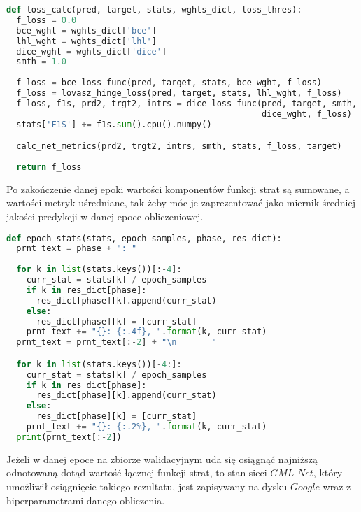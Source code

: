\cell
\begin{lstlisting}[name=Rozdzial3.1, language=Python]
def loss_calc(pred, target, stats, wghts_dict, loss_thres):
  f_loss = 0.0
  bce_wght = wghts_dict['bce']
  lhl_wght = wghts_dict['lhl']
  dice_wght = wghts_dict['dice']
  smth = 1.0
  
  f_loss = bce_loss_func(pred, target, stats, bce_wght, f_loss)
  f_loss = lovasz_hinge_loss(pred, target, stats, lhl_wght, f_loss)
  f_loss, f1s, prd2, trgt2, intrs = dice_loss_func(pred, target, smth, stats, 
                                                   dice_wght, f_loss)
  stats['F1S'] += f1s.sum().cpu().numpy()

  calc_net_metrics(prd2, trgt2, intrs, smth, stats, f_loss, target)
  
  return f_loss
\end{lstlisting}


\cell
Po zakończenie danej epoki wartości komponentów funkcji strat są sumowane, a wartości metryk uśredniane, tak żeby móc je zaprezentować jako miernik średniej jakości predykcji w danej epoce obliczeniowej.

\cell
\begin{lstlisting}[name=Rozdzial3.1, language=Python]
def epoch_stats(stats, epoch_samples, phase, res_dict):
  prnt_text = phase + ": "
  
  for k in list(stats.keys())[:-4]:
    curr_stat = stats[k] / epoch_samples
    if k in res_dict[phase]:
      res_dict[phase][k].append(curr_stat)
    else:
      res_dict[phase][k] = [curr_stat]
    prnt_text += "{}: {:.4f}, ".format(k, curr_stat)  
  prnt_text = prnt_text[:-2] + "\n       "

  for k in list(stats.keys())[-4:]:
    curr_stat = stats[k] / epoch_samples
    if k in res_dict[phase]:
      res_dict[phase][k].append(curr_stat)
    else:
      res_dict[phase][k] = [curr_stat]
    prnt_text += "{}: {:.2%}, ".format(k, curr_stat)
  print(prnt_text[:-2])
\end{lstlisting}


\cell
Jeżeli w danej epoce na zbiorze walidacyjnym uda się osiągnąć najniższą odnotowaną dotąd wartość łącznej funkcji strat, to stan sieci $\textit{GML-Net}$, który umożliwił osiągnięcie takiego rezultatu, jest zapisywany na dysku $\textit{Google}$ wraz z hiperparametrami danego obliczenia.

